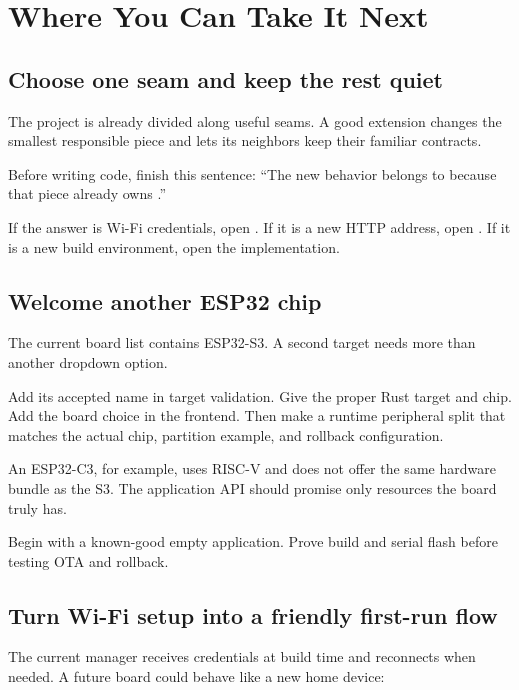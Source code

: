 \chapter{Where You Can Take It Next}

\section{Choose one seam and keep the rest quiet}

The project is already divided along useful seams. A good extension changes the smallest responsible piece and lets its neighbors keep their familiar contracts.

Before writing code, finish this sentence: ``The new behavior belongs to \underline{\hspace{4cm}} because that piece already owns \underline{\hspace{4cm}}.''

If the answer is Wi-Fi credentials, open . If it is a new HTTP address, open . If it is a new build environment, open the  implementation.

\section{Welcome another ESP32 chip}

The current board list contains ESP32-S3. A second target needs more than another dropdown option.

Add its accepted name in target validation. Give  the proper Rust target and  chip. Add the board choice in the frontend. Then make a runtime peripheral split that matches the actual chip, partition example, and rollback configuration.

An ESP32-C3, for example, uses RISC-V and does not offer the same hardware bundle as the S3. The application API should promise only resources the board truly has.

Begin with a known-good empty application. Prove build and serial flash before testing OTA and rollback.

\section{Turn Wi-Fi setup into a friendly first-run flow}

The current manager receives credentials at build time and reconnects when needed. A future board could behave like a new home device:

